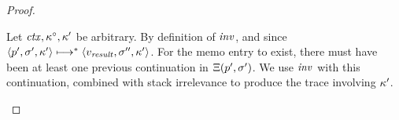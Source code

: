 \begin{proof}
\begin{byCases}
{    Let $\mathit{ctx}, \kappa^\circ, \kappa'$ be arbitrary.
    By definition of $\mathit{inv}$, and since $\langle p',\sigma',\kappa' \rangle \longmapsto^* \langle v_{\mathit{result}}, \sigma'', \kappa' \rangle$.
    For the memo entry to exist, there must have been at least one previous continuation in $\Xi(p',\sigma')$.
    We use $\mathit{inv}$ with this continuation, combined with stack irrelevance to produce the trace involving $\kappa'$.
    }
  \end{byCases}
\end{proof}

